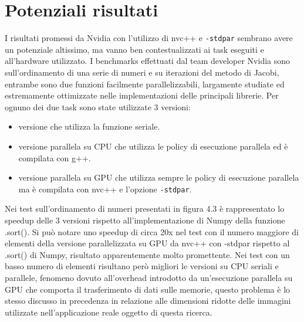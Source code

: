 \documentclass[12pt,a4paper]{report}
\begin{document}
\section{Potenziali risultati}

I risultati promessi da Nvidia con l'utilizzo di nvc++ e \verb|-stdpar| sembrano avere un potenziale altissimo, ma vanno ben contestualizzati ai task eseguiti e all'hardware utilizzato. \newline
I benchmarks effettuati dal team developer Nvidia sono sull'ordinamento di una serie di numeri e su iterazioni del metodo di Jacobi, entrambe sono due funzioni facilmente parallelizzabili, largamente studiate ed estremamente ottimizzate nelle implementazioni delle principali librerie.
Per ognuno dei due task sono state utilizzate 3 versioni:
\begin{itemize}
\item versione che utilizza la funzione seriale.
\item versione parallela su CPU che utilizza le policy di esecuzione parallela ed è compilata con g++.
\item versione parallela su GPU che utilizza sempre le policy di esecuzione parallela ma è compilata con nvc++ e l'opzione \verb|-stdpar|.
\end{itemize}

Nei test sull'ordinamento di numeri presentati in figura 4.3 è rappresentato lo speedup delle 3 versioni rispetto all'implementazione di Numpy della funzione .sort(). Si può notare uno speedup di circa 20x nel test con il numero maggiore di elementi della versione parallelizzata su GPU da nvc++ con -stdpar rispetto al .sort() di Numpy, risultato apparentemente molto promettente. Nei test con un basso numero di elementi risultano però migliori le versioni su CPU seriali e parallele, fenomeno dovuto all'overhead introdotto da un'esecuzione parallela su GPU che comporta il trasferimento di dati sulle memorie, questo problema è lo stesso discusso in precedenza in relazione alle dimensioni ridotte delle immagini utilizzate nell'applicazione reale oggetto di questa ricerca.
\end{document}
